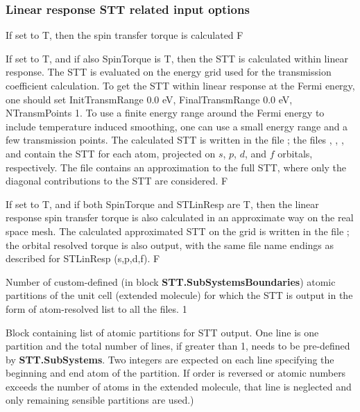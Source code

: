 \documentclass[11pt]{article}
\begin{document}
{\subsubsection{Linear response STT related input options}


{If set to T, then the spin transfer torque is calculated}
{F}

{If set to T, and if also SpinTorque is T, then the STT is calculated within linear response. The STT is evaluated on the energy grid used for the transmission coefficient calculation. To get the STT within linear response at the Fermi energy, one should set InitTransmRange 0.0 eV, FinalTransmRange 0.0 eV, NTransmPoints 1. To use a finite energy range around the Fermi energy to include temperature induced smoothing, one can use a small energy range and a few transmission points. The calculated STT is written in the file
; the files , , , and  contain the STT for each atom, projected on $s$, $p$, $d$, and $f$ orbitals, respectively. The file  contains an approximation to the full STT, where only the diagonal contributions to the STT are considered.}
{F}

{If set to T, and if both SpinTorque and STLinResp are T, then the linear response spin transfer torque is also calculated in an approximate way on the real space mesh. The calculated approximated STT on the grid is written in the file
; the orbital resolved torque is also output, with the same file name endings as described for STLinResp (s,p,d,f).}
{F}

{Number of custom-defined (in block {\bf STT.SubSystemsBoundaries}) atomic partitions of the unit cell (extended molecule) for which the STT is output in the form of atom-resolved list to all the  files.}
{1}

{Block containing list of atomic partitions for STT output. One line is one partition and the total number of lines, if greater than 1, needs to be pre-defined by {\bf STT.SubSystems}. Two integers are expected on each line specifying the beginning and end atom of the partition. If order is reversed or atomic numbers exceeds  the number of atoms in the extended molecule, that line is neglected and only remaining sensible partitions are used.)

}}
\end{document}
